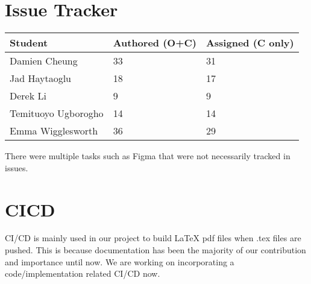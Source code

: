 \documentclass{article}
\begin{document}

\section{Issue Tracker}

\begin{table}[H]
    \centering
    \begin{tabular}{lll}
        \toprule
        \textbf{Student} & \textbf{Authored (O+C)} & \textbf{Assigned (C only)} \\
        \midrule
        Damien Cheung           & 33                     & 31                        \\
        Jad Haytaoglu           & 18                     & 17                        \\
        Derek Li           & 9                     & 9                        \\
        Temituoyo Ugborogho           & 14                     & 14                        \\
        Emma Wigglesworth           & 36                     & 29                        \\
        \bottomrule
    \end{tabular}
\end{table}

There were multiple tasks such as Figma that were not necessarily tracked
in issues.

\section{CICD}



CI/CD is mainly used in our project to build LaTeX pdf files when .tex
files are pushed. This is because documentation has been the majority
of our contribution and importance until now. We are working on  
incorporating a code/implementation related CI/CD now.
\end{document}
